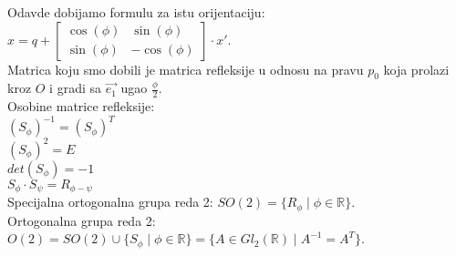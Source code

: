 \documentclass[12pt]{article}
\begin{document}
    Odavde dobijamo formulu za istu orijentaciju: $x=q+\begin{bmatrix}
    \cos(\phi) & \sin(\phi)  \\
    \sin(\phi) & -\cos(\phi)
\end{bmatrix}\cdot x'$.\\
    Matrica koju smo dobili je matrica refleksije u odnosu na pravu $p_0$ koja
    prolazi kroz $O$ i gradi sa $\overrightarrow{e_1}$ ugao $\frac{\phi}{2}$.\\
    Osobine matrice refleksije:\\
$(S_\phi)^{-1}=(S_\phi)^T$\\
$(S_\phi)^{2}=E$\\
$det(S_\phi)=-1$\\
$S_\phi\cdot S_\psi=R_{\phi-\psi}$\\
    Specijalna ortogonalna grupa reda 2: $SO(2)=\{R_\phi\mid\phi\in\mathbb{R}\}$.\\
    Ortogonalna grupa reda 2: $O(2)=SO(2)\cup\{S_\phi\mid\phi\in\mathbb{R}\}=\{A\in Gl_2(\mathbb{R})\mid A^{-1}=A^T\}$.
    \par
\end{document}
